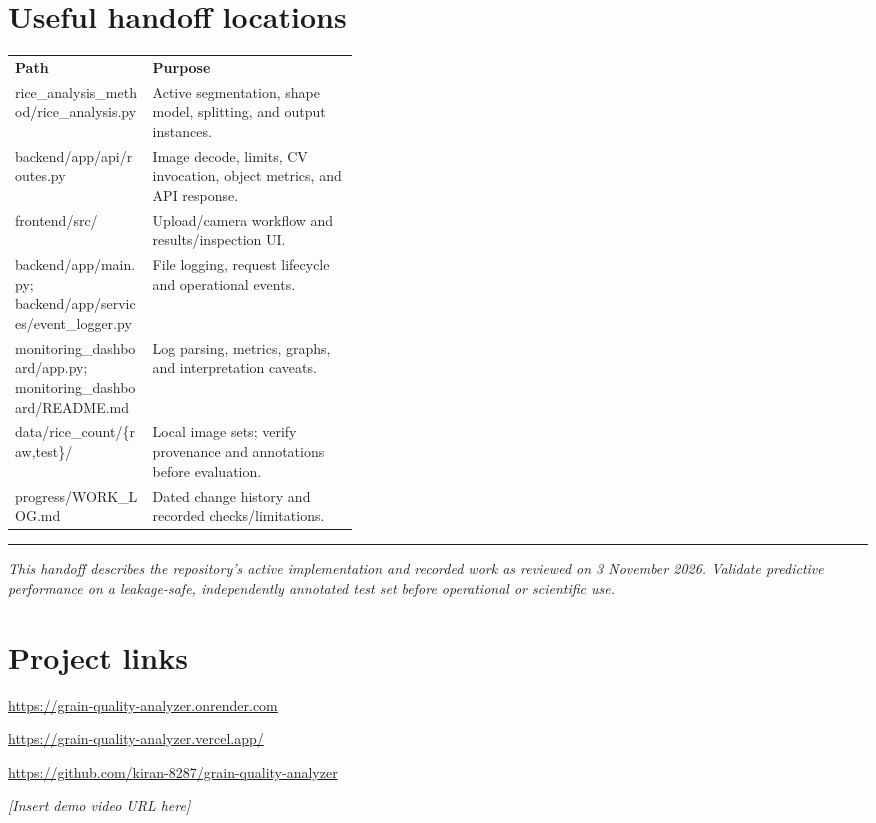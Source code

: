 \documentclass[10pt,a4paper]{article}
\renewcommand{\arraystretch}{1.08}
\newcommand{\hdr}[1]{\textbf{#1}}
\begin{document}
\section{Useful handoff locations}
\begingroup\small
\setlength{\tabcolsep}{5pt}\renewcommand{\arraystretch}{1.12}
\begin{tabularx}{\linewidth}{>{\raggedright\arraybackslash\leavevmode\ttfamily}p{0.40\linewidth}Y}
\toprule
\hdr{Path} & \hdr{Purpose} \\
rice\_analysis\_method/\allowbreak rice\_analysis.py & Active segmentation, shape model, splitting, and output instances. \\
backend/app/api/routes.py & Image decode, limits, CV invocation, object metrics, and API response. \\
frontend/src/ & Upload/camera workflow and results/inspection UI. \\
backend/app/main.py; backend/app/services/\allowbreak event\_logger.py & File logging, request lifecycle and operational events. \\
monitoring\_dashboard/app.py; monitoring\_dashboard/README.md & Log parsing, metrics, graphs, and interpretation caveats. \\
data/rice\_count/\{raw,test\}/ & Local image sets; verify provenance and annotations before evaluation. \\
progress/WORK\_LOG.md & Dated change history and recorded checks/limitations. \\
\bottomrule
\end{tabularx}
\endgroup

\vfill
\hrule height 0.4pt
\vspace{3pt}
{\footnotesize\textit{This handoff describes the repository's active implementation and recorded work as reviewed on 3 November 2026. Validate predictive performance on a leakage-safe, independently annotated test set before operational or scientific use.}}

\section*{Project links}
\begin{description}[leftmargin=1.55in,labelwidth=1.45in,itemsep=2pt,topsep=3pt]
  \item[Backend API (Render):] \url{https://grain-quality-analyzer.onrender.com}
  \item[Frontend (Vercel):] \url{https://grain-quality-analyzer.vercel.app/}
  \item[Source code (GitHub):] \url{https://github.com/kiran-8287/grain-quality-analyzer}
  \item[Demo video:] \textit{[Insert demo video URL here]}
\end{description}
\end{document}
